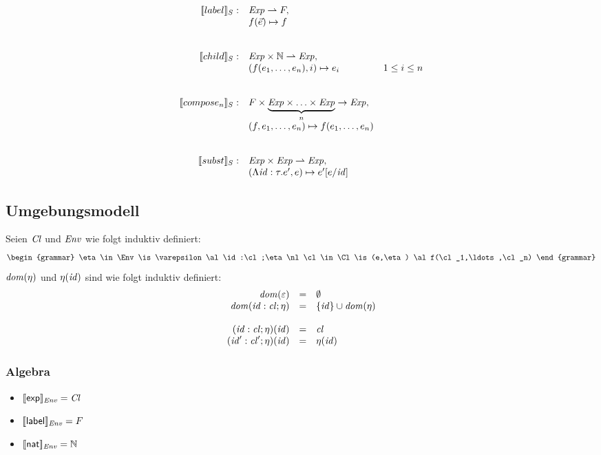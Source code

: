 \documentclass[12pt,a4paper,draft]{article}
\begin{document}
\[\begin{array}{rll}
  \sem{label}_S: & \Exp \pto F, \\
  & f(\vec{e}) \mapsto f \\
  \\\\
  \sem{child}_S: & \Exp \times \N \pto \Exp, \\
  & (f(e_1,\ldots,e_n),i) \mapsto e_i & 1 \le i \le n \\
  \\\\
  \sem{compose_n}_S: & F \times \underbrace{\Exp \times \ldots \times \Exp}_n \to \Exp, \\
  & (f, e_1,\ldots,e_n) \mapsto f(e_1,\ldots,e_n) \\
  \\\\
  \sem{subst}_S: & \Exp \times \Exp \pto \Exp, \\
  & (\Lambda\id:\tau.e',e) \mapsto e'[e/\id] \\
\end{array}\]


\subsection*{Umgebungsmodell}

Seien $\mathit{Cl}$ und $\mathit{Env}$ wie folgt induktiv definiert:
\[\begin{grammar}
  \eta \in \Env
  \is \varepsilon
  \al \id:\cl;\eta
  \nl
  \cl \in \Cl
  \is (e,\eta)
  \al f(\cl_1,\ldots,\cl_n)
\end{grammar}\]
$\mathit{dom}(\eta)$ und $\eta(\mathit{id})$ sind wie folgt induktiv definiert:
\[\begin{array}{rcl}
  \mathit{dom}(\varepsilon) &=& \emptyset \\
  \mathit{dom}(\mathit{id}:\mathit{cl};\eta) &=& \{\mathit{id}\} \cup \mathit{dom}(\eta) \\
  \\
  (\mathit{id}:\mathit{cl};\eta)(\mathit{id}) &=& \mathit{cl} \\
  (\mathit{id}':\mathit{cl}';\eta)(\mathit{id}) &=& \eta(\mathit{id}) \\
\end{array}\]

\subsubsection*{Algebra}

\begin{itemize}
\item $[\![\mathsf{exp}]\!]_{\mathit{Env}} = \mathit{Cl}$
\item $[\![\mathsf{label}]\!]_{\mathit{Env}} = F$
\item $[\![\mathsf{nat}]\!]_{\mathit{Env}} = \mathbb N$
\end{itemize}
\end{document}
